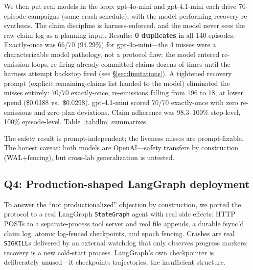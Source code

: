 \documentclass[10pt,journal,compsoc]{IEEEtran}
\begin{document}
We then put real models in the loop: gpt-4o-mini and
gpt-4.1-mini each drive 70-episode campaigns (same crash
schedule), with the model performing recovery re-synthesis.
The claim discipline is harness-enforced, and the model never
sees the raw claim log as a planning input. Results:
\textbf{0 duplicates} in all 140 episodes. Exactly-once was
66/70 (94.29\%) for gpt-4o-mini---the 4 misses were a
characterizable model pathology, not a protocol flaw: the model
entered re-emission loops, re-firing already-committed claims
dozens of times until the harness attempt backstop fired (see
\S\ref{sec:limitations}). A tightened recovery prompt
(explicit remaining-claims list handed to the model)
eliminated the misses entirely: 70/70 exactly-once, re-emissions
falling from 196 to 18, at lower spend (\$0.0188 vs.\ \$0.0298).
gpt-4.1-mini scored 70/70 exactly-once with zero re-emissions
and zero plan deviations. Claim adherence was 98.3--100\%
step-level, 100\% episode-level. Table~\ref{tab:llm} summarizes.

\begin{table}[ht]
\centering
\caption{LLM-driven validation (70 episodes/model, same crash
schedule).}
\label{tab:llm}
\end{table}

The safety result is
prompt-independent; the liveness misses are prompt-fixable.
The honest caveat: both models are OpenAI---safety transfers
by construction (WAL+fencing), but cross-lab generalization is
untested.

\subsection{Q4: Production-shaped LangGraph deployment}

To answer the ``not productionalized'' objection by
construction, we ported the protocol to a real LangGraph
\texttt{StateGraph} agent with real side effects: HTTP POSTs to
a separate-process tool server and real file appends, a durable
fsync'd claim log, atomic log-fenced checkpoints, and epoch
fencing. Crashes are real \texttt{SIGKILL}s delivered by an
external watchdog that only observes progress markers;
recovery is a new cold-start process. LangGraph's own
checkpointer is deliberately unused---it checkpoints
trajectories, the insufficient structure.
\end{document}
